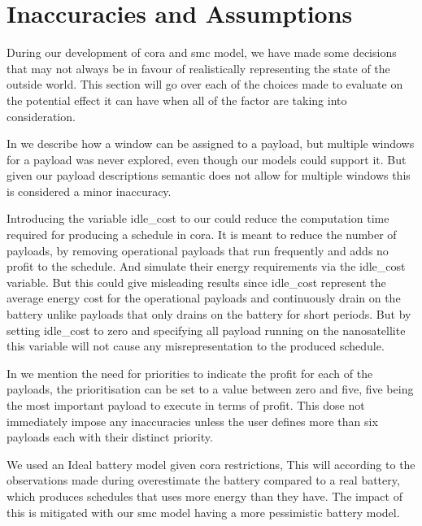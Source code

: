 \section{Inaccuracies and Assumptions}\label{sec:in_and_ass}
During our development of \gls{cora} and \gls{smc} model, we have made some decisions that may not always be in favour of realistically representing the state of the outside world. This section will go over each of the choices made to evaluate on the potential effect it can have when all of the factor are taking into consideration.

In  we describe how a window can be assigned to a payload, but multiple windows for a payload was never explored, even though our models could support it. But given our payload descriptions semantic does not allow for multiple windows this is considered a minor inaccuracy.

Introducing the variable idle\_cost to our  could reduce the computation time required for producing a schedule in \gls{cora}. It is meant to reduce the number of payloads, by removing operational payloads that run frequently and adds no profit to the schedule. And simulate their energy requirements via the idle\_cost variable. But this could give misleading results since idle\_cost represent the average energy cost for the operational payloads and continuously drain on the battery unlike payloads that only drains on the battery for short periods. But by setting idle\_cost to zero and specifying all payload running on the nanosatellite this variable will not cause any misrepresentation to the produced schedule.

In  we mention the need for priorities to indicate the profit for each of the payloads, the prioritisation can be set to a value between zero and five, five being the most important payload to execute in terms of profit. This dose not immediately impose any inaccuracies unless the user defines more than six payloads each with their distinct priority.

We used an Ideal battery model given \gls{cora} restrictions, This will according to the observations made during  overestimate the battery compared to a real battery, which produces schedules that uses more energy than they have. The impact of this is mitigated with our \gls{smc} model having a more pessimistic battery model.

